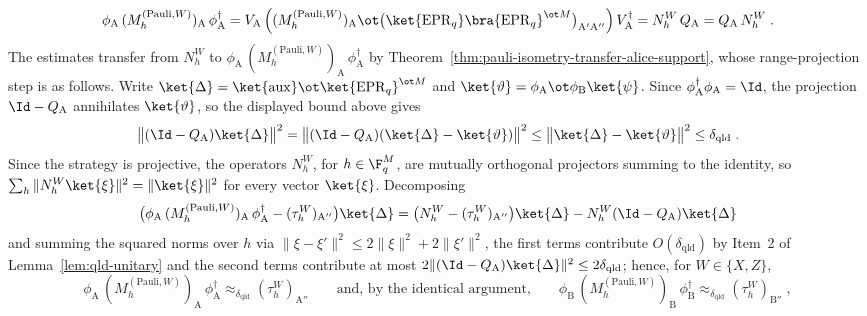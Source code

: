 \begin{remark}
	\[
		\phi_{\mathrm{A}} \, (M^{(\mathrm{Pauli},W)}_h)_{\mathrm{A}} \, \phi_{\mathrm{A}}^\dagger
		= V_{\mathrm{A}} \, \Bigl( (M^{(\mathrm{Pauli},W)}_h)_{\mathrm{A}} \ot \bigl(\ket{\mathrm{EPR}_q}\bra{\mathrm{EPR}_q}^{\ot M}\bigr)_{\mathrm{A}'\mathrm{A}''} \Bigr) \, V_{\mathrm{A}}^\dagger
		= N^W_h \, Q_{\mathrm{A}} = Q_{\mathrm{A}} \, N^W_h\;.
	\]
	The estimates transfer from $N^W_h$ to $\phi_{\mathrm{A}} \, (M^{(\mathrm{Pauli},W)}_h)_{\mathrm{A}} \, \phi_{\mathrm{A}}^\dagger$ by Theorem~\ref{thm:pauli-isometry-transfer-alice-support}, whose range-projection step is as follows. Write $\ket{\Delta} = \ket{\mathrm{aux}} \ot \ket{\mathrm{EPR}_q}^{\ot M}$ and $\ket{\vartheta} = \phi_{\mathrm{A}} \ot \phi_{\mathrm{B}} \ket{\psi}$. Since $\phi_{\mathrm{A}}^\dagger \phi_{\mathrm{A}} = \Id$, the projection $\Id - Q_{\mathrm{A}}$ annihilates $\ket{\vartheta}$, so the displayed bound above gives
	\[
		\bigl\| (\Id - Q_{\mathrm{A}}) \ket{\Delta} \bigr\|^2
		= \bigl\| (\Id - Q_{\mathrm{A}}) (\ket{\Delta} - \ket{\vartheta}) \bigr\|^2
		\leq \bigl\| \ket{\Delta} - \ket{\vartheta} \bigr\|^2
		\leq \delta_{\mathrm{qld}}\;.
	\]
	Since the strategy is projective, the operators $N^W_h$, for $h \in \F_q^M$, are mutually orthogonal projectors summing to the identity, so $\sum_h \| N^W_h \ket{\xi} \|^2 = \| \ket{\xi} \|^2$ for every vector $\ket{\xi}$. Decomposing
	\[
		\bigl( \phi_{\mathrm{A}} \, (M^{(\mathrm{Pauli},W)}_h)_{\mathrm{A}} \, \phi_{\mathrm{A}}^\dagger - (\tau^W_h)_{\mathrm{A}''} \bigr) \ket{\Delta}
		= \bigl( N^W_h - (\tau^W_h)_{\mathrm{A}''} \bigr) \ket{\Delta} - N^W_h (\Id - Q_{\mathrm{A}}) \ket{\Delta}
	\]
	and summing the squared norms over $h$ via $\| \xi - \xi' \|^2 \leq 2\|\xi\|^2 + 2\|\xi'\|^2$, the first terms contribute $O(\delta_{\mathrm{qld}})$ by Item~2 of Lemma~\ref{lem:qld-unitary} and the second terms contribute at most $2 \| (\Id - Q_{\mathrm{A}}) \ket{\Delta} \|^2 \leq 2\delta_{\mathrm{qld}}$; hence, for $W \in \{X,Z\}$,
	\[
		\phi_{\mathrm{A}} \, (M^{(\mathrm{Pauli},W)}_h)_{\mathrm{A}} \, \phi_{\mathrm{A}}^\dagger \approx_{\delta_{\mathrm{qld}}} (\tau^W_h)_{\mathrm{A}''}
		\qquad \text{and, by the identical argument,} \qquad
		\phi_{\mathrm{B}} \, (M^{(\mathrm{Pauli},W)}_h)_{\mathrm{B}} \, \phi_{\mathrm{B}}^\dagger \approx_{\delta_{\mathrm{qld}}} (\tau^W_h)_{\mathrm{B}''}\;,
	\]

\end{remark}

